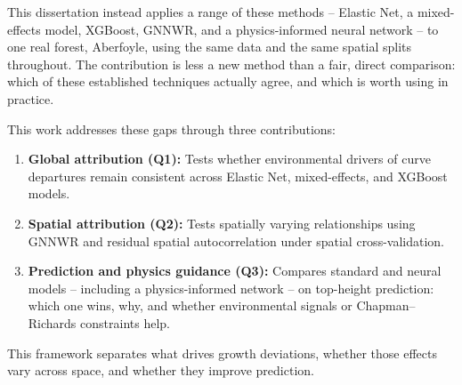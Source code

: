 This dissertation instead applies a range of these methods -- Elastic Net, a mixed-effects model, XGBoost, GNNWR, and a physics-informed neural network -- to one real forest, Aberfoyle, using the same data and the same spatial splits throughout. The contribution is less a new method than a fair, direct comparison: which of these established techniques actually agree, and which is worth using in practice.

This work addresses these gaps through three contributions:
\begin{enumerate}
\setlength\itemsep{0pt}
\item \textbf{Global attribution (Q1):} Tests whether environmental drivers of curve departures remain consistent across Elastic Net, mixed-effects, and XGBoost models.
\item \textbf{Spatial attribution (Q2):} Tests spatially varying relationships using GNNWR and residual spatial autocorrelation under spatial cross-validation.
\item \textbf{Prediction and physics guidance (Q3):} Compares standard and neural models -- including a physics-informed network -- on top-height prediction: which one wins, why, and whether environmental signals or Chapman--Richards constraints help.
\end{enumerate}
This framework separates what drives growth deviations, whether those effects vary across space, and whether they improve prediction.
